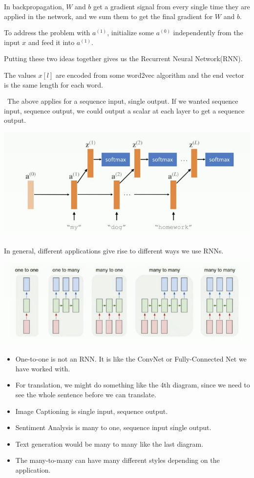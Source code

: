 \documentclass[11pt]{scrartcl}
\begin{document}
\begin{remark} In backpropagation, $W$ and $b$ get a gradient signal from every single time they are applied in the network, and we sum them to get the final gradient for $W$ and $b$.
\end{remark}

To address the problem with $a^{(1)}$, initialize some $a^{(0)}$ independently from the input $x$ and feed it into $a^{(1)}.$

Putting these two ideas together gives us the Recurrent Neural Network(RNN).

\begin{remark} The values $x[l]$ are encoded from some word2vec algorithm and the end vector is the same length for each word.
\end{remark}
\
The above applies for a sequence input, single output.  If we wanted sequence input, sequence output, we could output a scalar at each layer to get a sequence output.
\begin{center}
\includegraphics[scale=0.8]{images/seqout.png}
\end{center}

In general, different applications give rise to different ways we use RNNs.

\begin{center}
\includegraphics[scale=0.8]{images/atob.png}
\end{center}
\begin{itemize}
\item One-to-one is not an RNN.  It is like the ConvNet or Fully-Connected Net we have worked with.
\item For translation, we might do something like the 4th diagram, since we need to see the whole sentence before we can translate.
\item Image Captioning is single input, sequence output.
\item Sentiment Analysis is many to one, sequence input single output.
\item Text generation would be many to many like the last diagram.  
\item The many-to-many can have many different styles depending on the application.
\end{itemize}
\end{document}
